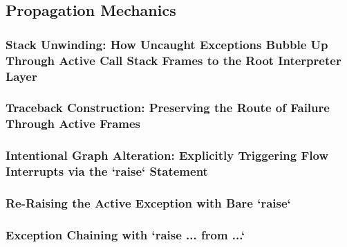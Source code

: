 \subsection{Propagation Mechanics}
\subsubsection{Stack Unwinding: How Uncaught Exceptions Bubble Up Through Active Call Stack Frames to the Root Interpreter Layer}
\subsubsection{Traceback Construction: Preserving the Route of Failure Through Active Frames}
\subsubsection{Intentional Graph Alteration: Explicitly Triggering Flow Interrupts via the `raise` Statement}
\subsubsection{Re-Raising the Active Exception with Bare `raise`}
\subsubsection{Exception Chaining with `raise ... from ...`}
